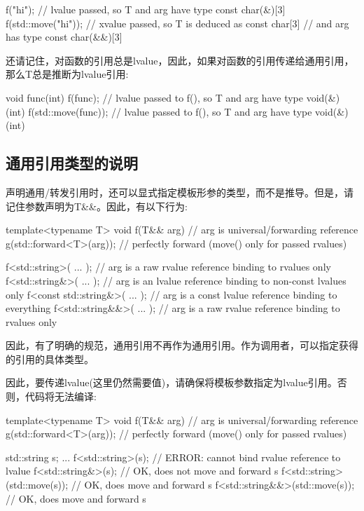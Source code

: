 \begin{cppcode}
f("hi"); // lvalue passed, so T and arg have type const char(&)[3]
f(std::move("hi")); // xvalue passed, so T is deduced as const char[3]
// and arg has type const char(&&)[3]
\end{cppcode}

还请记住，对函数的引用总是lvalue，因此，如果对函数的引用传递给通用引用，那么T总是推断为lvalue引用:

\begin{cppcode}
void func(int) {
}
f(func); // lvalue passed to f(), so T and arg have type void(&)(int)
f(std::move(func)); // lvalue passed to f(), so T and arg have type void(&)(int)
\end{cppcode}

\subsection{通用引用类型的说明}

声明通用/转发引用时，还可以显式指定模板形参的类型，而不是推导。但是，请记住参数声明为T\&\&。因此，有以下行为:

\begin{cppcode}
template<typename T>
void f(T&& arg) // arg is universal/forwarding reference
{
	g(std::forward<T>(arg)); // perfectly forward (move() only for passed rvalues)
}

f<std::string>( ... ); // arg is a raw rvalue reference binding to rvalues only
f<std::string&>( ... ); // arg is an lvalue reference binding to non-const lvalues only
f<const std::string&>( ... ); // arg is a const lvalue reference binding to everything
f<std::string&&>( ... ); // arg is a raw rvalue reference binding to rvalues only
\end{cppcode}

因此，有了明确的规范，通用引用不再作为通用引用。作为调用者，可以指定获得的引用的具体类型。

因此，要传递lvalue(这里仍然需要值)，请确保将模板参数指定为lvalue引用。否则，代码将无法编译:

\begin{cppcode}
template<typename T>
void f(T&& arg) // arg is universal/forwarding reference
{
	g(std::forward<T>(arg)); // perfectly forward (move() only for passed rvalues)
}

std::string s;
...
f<std::string>(s); // ERROR: cannot bind rvalue reference to lvalue
f<std::string&>(s); // OK, does not move and forward s
f<std::string>(std::move(s)); // OK, does move and forward s
f<std::string&&>(std::move(s)); // OK, does move and forward s
\end{cppcode}

